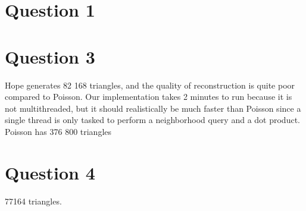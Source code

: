 \documentclass[a4paper]{article}
\begin{document}





\section*{Question 1}

\section*{Question 3}
Hope generates 82 168 triangles, and the quality of
reconstruction is quite poor compared to Poisson. Our implementation takes
2 minutes to run because it is not multithreaded, but it should realistically
be much faster than Poisson since a single thread is only tasked to perform
a neighborhood query and a dot product. Poisson has 376 800 triangles

\section*{Question 4}
77164 triangles.
\end{document}
